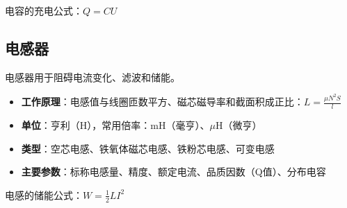电容的充电公式：$Q = CU$

\subsection{电感器}

电感器用于阻碍电流变化、滤波和储能。

\begin{itemize}
    \item \textbf{工作原理}：电感值与线圈匝数平方、磁芯磁导率和截面积成正比：$L = \frac{\mu N^2 S}{l}$
    \item \textbf{单位}：亨利（H），常用倍率：mH（毫亨）、$\mu$H（微亨）
    \item \textbf{类型}：空芯电感、铁氧体磁芯电感、铁粉芯电感、可变电感
    \item \textbf{主要参数}：标称电感量、精度、额定电流、品质因数（Q值）、分布电容
\end{itemize}

电感的储能公式：$W = \frac{1}{2}LI^2$
